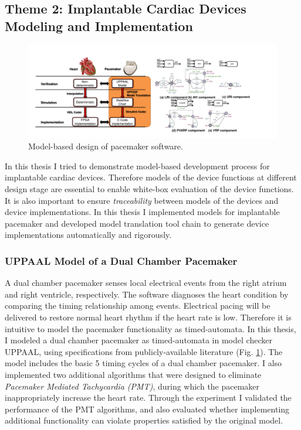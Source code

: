 \documentclass[a4paper]{article}
\begin{document}
\subsection{Theme 2: Implantable Cardiac Devices Modeling and Implementation}
\begin{figure}[t]
	\centering
	\includegraphics[scale=0.32]{figs/mb_device.pdf}
	\caption{\small Model-based design of pacemaker software.}
	\label{fig:mb_device}
\end{figure}
In this thesis I tried to demonstrate model-based development process for implantable cardiac devices.
Therefore models of the device functions at different design stage are essential to enable white-box evaluation of the device functions.
It is also important to ensure \emph{traceability} between models of the devices and device implementations.
In this thesis I implemented models for implantable pacemaker and developed model translation tool chain to generate device implementations automatically and rigorously.
\subsubsection{UPPAAL Model of a Dual Chamber Pacemaker}
A dual chamber pacemaker senses local electrical events from the right atrium and right ventricle, respectively.
The software diagnoses the heart condition by comparing the timing relationship among events.
Electrical pacing will be delivered to restore normal heart rhythm if the heart rate is low.
Therefore it is intuitive to model the pacemaker functionality as timed-automata.
In this thesis, I modeled a dual chamber pacemaker as timed-automata in model checker UPPAAL, using specifications from publicly-available literature (Fig. \ref{fig:mb_device}).
The model includes the basic 5 timing cycles of a dual chamber pacemaker.
I also implemented two additional algorithms that were designed to eliminate \emph{Pacemaker Mediated Tachycardia (PMT)}, during which the pacemaker inappropriately increase the heart rate.
Through the experiment I validated the performance of the PMT algorithms, and also evaluated whether implementing additional functionality can violate properties satisfied by the original model.
\end{document}
